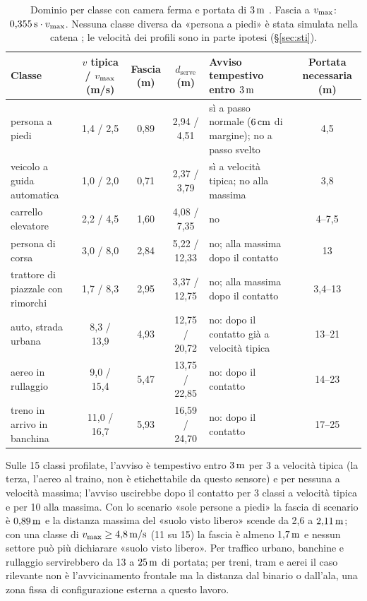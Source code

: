\begin{table}[H]\centering\footnotesize
\caption{Dominio per classe con camera ferma e portata di $3\unita{m}$ . Fascia a $\vmax$: $0{,}355\unita{s}\cdot\vmax$. Nessuna classe diversa da «persona a piedi» è stata simulata nella catena ; le velocità dei profili sono in parte ipotesi (\S\ref{sec:sti}).}\label{tab:occ-classi}
\begin{tabularx}{\linewidth}{>{\RaggedRight\arraybackslash}p{3.4cm} c c c L c}
\toprule
Classe & $v$ tipica / $\vmax$ (m/s) & Fascia (m) & $d_{\mathrm{serve}}$ (m) & Avviso tempestivo entro $3\unita{m}$ & Portata necessaria (m)\\
\midrule
persona a piedi & 1,4 / 2,5 & 0,89 & 2,94 / 4,51 & sì a passo normale ($6\,\mathrm{cm}$ di margine); no a passo svelto & 4,5\\
veicolo a guida automatica & 1,0 / 2,0 & 0,71 & 2,37 / 3,79 & sì a velocità tipica; no alla massima & 3,8\\
carrello elevatore & 2,2 / 4,5 & 1,60 & 4,08 / 7,35 & no & 4--7,5\\
persona di corsa & 3,0 / 8,0 & 2,84 & 5,22 / 12,33 & no; alla massima dopo il contatto & 13\\
trattore di piazzale con rimorchi & 1,7 / 8,3 & 2,95 & 3,37 / 12,75 & no; alla massima dopo il contatto & 3,4--13\\
auto, strada urbana & 8,3 / 13,9 & 4,93 & 12,75 / 20,72 & no: dopo il contatto già a velocità tipica & 13--21\\
aereo in rullaggio & 9,0 / 15,4 & 5,47 & 13,75 / 22,85 & no: dopo il contatto & 14--23\\
treno in arrivo in banchina & 11,0 / 16,7 & 5,93 & 16,59 / 24,70 & no: dopo il contatto & 17--25\\
\bottomrule
\end{tabularx}
\end{table}

Sulle 15 classi profilate, l'avviso è tempestivo entro $3\unita{m}$ per 3 a velocità tipica (la terza, l'aereo al traino, non è etichettabile da questo sensore) e per nessuna a velocità massima; l'avviso uscirebbe dopo il contatto per 3 classi a velocità tipica e per 10 alla massima. Con lo scenario «sole persone a piedi» la fascia di scenario è $0{,}89\,\mathrm{m}$ e la distanza massima del «suolo visto libero» scende da 2,6 a $2{,}11\,\mathrm{m}$; con una classe di $v_{\max}\ge4{,}8\,\mathrm{m/s}$ (11 su 15) la fascia è almeno $1{,}7\,\mathrm{m}$ e nessun settore può più dichiarare «suolo visto libero». Per traffico urbano, banchine e rullaggio servirebbero da 13 a $25\,\mathrm{m}$ di portata; per treni, tram e aerei il caso rilevante non è l'avvicinamento frontale ma la distanza dal binario o dall'ala, una zona fissa di configurazione esterna a questo lavoro.

